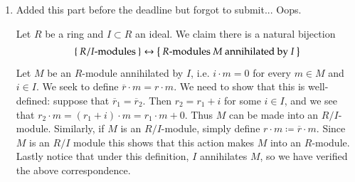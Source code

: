 \documentclass[12pt]{article}
\theoremstyle{definitionstyle}
\def \cph{\varphi}
\begin{document}
\begin{enumerate}
\begin{enumerate}
			Suppose we are given maps $\cph: P \to N$ and $f: M \twoheadrightarrow N$. Let $Q$ be so that $P \oplus Q$ is free, let $\Set{x_i}_{i \in I}$ be a basis, and define $\psi(p,q) = (\cph \circ \pi)(p, q) = \cph(p)$. Then the following diagram commutes:
			\[\begin{tikzcd}
				& P & {P \oplus Q} \\
				M & N
				\arrow["\cph"', from=1-2, to=2-2]
				\arrow["\psi", from=1-3, to=2-2]
				\arrow[hook, from=1-2, to=1-3]
				\arrow["f", two heads, from=2-1, to=2-2]
			\end{tikzcd}\]
			Since $f$ is surjective, for each $x_i$ let $m_i$ be any element of $M$ satisfying $f(m_i) = \psi(x_i)$. In particular, $m_i$ need not be unique. Extend the map sending each $x_i$ to $m_i$ to an $R$-module homomorphism $\overline{\psi}: P \oplus Q \to M$, as per the universal property of free modules. We now have the following commutative diagram:
			\[\begin{tikzcd}
				&& {P \oplus Q} \\
				M & P \\
				& N
				\arrow["\psi", curve={height=-12pt}, from=1-3, to=3-2]
				\arrow[hook, from=2-2, to=1-3]
				\arrow["{\overline \psi}"', curve={height=12pt}, from=1-3, to=2-1]
				\arrow["f"', from=2-1, to=3-2]
				\arrow["\cph", from=2-2, to=3-2]
			\end{tikzcd}\]
			This diagram commutes precisely because if $m = \sum_{i \in I} r_ix_i$, with only finitely many $r_i \neq 0$, then
			\begin{align*}
				f(\overline \psi (m)) = f\qty(\overline \psi\qty(\sum_{i \in I} r_ix_i)) = \sum_{i \in I} r_i f(\overline \psi(x_i)) = \sum_{i \in I} r_if(m_i) = \sum_{i \in I} r_i\psi(x_i) = \psi(m)
			\end{align*}
			By construction, and if we let $\iota: P \to P \oplus Q$ be the canonical inclusion, $f \circ \overline \psi \circ \iota(p) = f \circ \overline \psi(p, 0) = \psi(p, 0) = \cph(p)$ as desired, which completes the proof.
			
			\item Added this part before the deadline but forgot to submit... Oops.
			
			Let $R$ be a ring and $I \subset R$ an ideal. We claim there is a natural bijection
			\begin{align*}
				\Set{R/I\text{-modules}} \leftrightarrow \Set{\text{$R$-modules $M$ annihilated by $I$}}
			\end{align*}
			Let $M$ be an $R$-module annihilated by $I$, i.e. $i \cdot m = 0$ for every $m \in M$ and $i \in I$. We seek to define $\overline r \cdot m = r \cdot m$. We need to show that this is well-defined: suppose that $\overline r_1 = \overline r_2$. Then $r_2 = r_1 + i$ for some $i \in I$, and we see that $r_2 \cdot m = (r_1+i) \cdot m = r_1 \cdot m + 0$. Thus $M$ can be made into an $R/I$-module. Similarly, if $M$ is an $R/I$-module, simply define $r \cdot m \coloneqq \overline r \cdot m$. Since $M$ is an $R/I$ module this shows that this action makes $M$ into an $R$-module. Lastly notice that under this definition, $I$ annihilates $M$, so we have verified the above correspondence.
			

\end{enumerate}
\end{enumerate}
\end{document}
